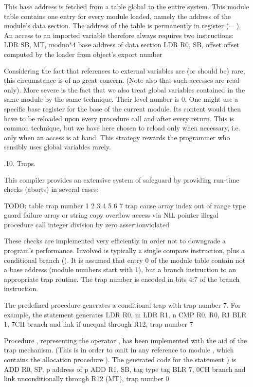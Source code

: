 This base address is fetched from a table global to the entire system. This module table contains one entry for every module loaded, namely the address of the module's data section. The address of the table is permanently in register  (= ). An access to an imported variable therefore always requires two instructions:
\begintt
LDR SB, MT, modno*4 base address of data section
LDR R0, SB, offset offset computed by the loader from object's export number
\endtt

\noindent Considering the fact that references to external variables are (or should be) rare, this circumstance is of no great concern. (Note also that such accesses are read-only). More severe is the fact that we also treat global variables contained in the same module by the same technique. Their level number is 0. One might use a specific base register for the base of the current module. Its content would then have to be reloaded upon every procedure call and after every return. This is common technique, but we have here chosen to reload only when necessary, i.e. only when an access is at hand. This strategy rewards the programmer who sensibly uses global variables rarely.

.10. Traps.

This compiler provides an extensive system of safeguard by providing run-time checks (aborts) in several cases:

TODO: table
trap number
1 2 3 4 5 6 7
trap cause
array index out of range type guard failure
array or string copy overflow access via NIL pointer illegal procedure call
integer division by zero assertionviolated

These checks are implemented very efficiently in order not to downgrade a program's performance. Involved is typically a single compare instruction, plus a conditional branch (). It is assumed that entry 0 of the module table contain not a base address (module numbers start with 1), but a branch instruction to an appropriate trap routine. The trap number is encoded in bits 4:7 of the branch instruction.

The predefined procedure  generates a conditional trap with trap number 7. For example, the statement  generates
\begintt
LDR R0, m
LDR R1, n
CMP R0, R0, R1
BLR 1, 7CH      branch and link if unequal through R12, trap number 7
\endtt

\noindent Procedure , representing the operator , has been implemented with the aid of the trap mechanism. (This is in order to omit in  any reference to module , which contains the allocation procedure ). The generated code for the statement ) is
\begintt
ADD R0, SP, p     address of p
ADD R1, SB, tag   type tag
BLR 7, 0CH        branch and link unconditionally through R12 (MT), trap number 0
\endtt

